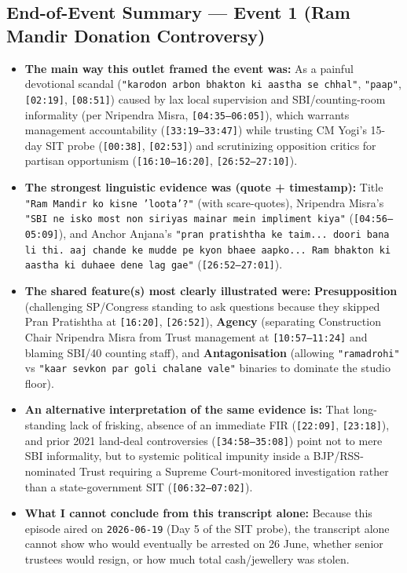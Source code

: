 \documentclass[10pt,a4paper]{article}
\begin{document}
\subsection*{End-of-Event Summary --- Event 1 (Ram Mandir Donation Controversy)}
\begin{itemize}[leftmargin=1.5em, itemsep=3pt, topsep=4pt]
  \item \textbf{The main way this outlet framed the event was:} As a painful devotional scandal (\texttt{"karodon arbon bhakton ki aastha se chhal"}, \texttt{"paap"}, \texttt{[02:19]}, \texttt{[08:51]}) caused by lax local supervision and SBI/counting-room informality (per Nripendra Misra, \texttt{[04:35--06:05]}), which warrants management accountability (\texttt{[33:19--33:47]}) while trusting CM Yogi's 15-day SIT probe (\texttt{[00:38]}, \texttt{[02:53]}) and scrutinizing opposition critics for partisan opportunism (\texttt{[16:10--16:20]}, \texttt{[26:52--27:10]}).
  \item \textbf{The strongest linguistic evidence was (quote + timestamp):} Title \texttt{"Ram Mandir ko kisne 'loota'?"} (with scare-quotes), Nripendra Misra's \texttt{"SBI ne isko most non siriyas mainar mein impliment kiya"} (\texttt{[04:56--05:09]}), and Anchor Anjana's \texttt{"pran pratishtha ke taim... doori bana li thi. aaj chande ke mudde pe kyon bhaee aapko... Ram bhakton ki aastha ki duhaee dene lag gae"} (\texttt{[26:52--27:01]}).
  \item \textbf{The shared feature(s) most clearly illustrated were:} \textbf{Presupposition} (challenging SP/Congress standing to ask questions because they skipped Pran Pratishtha at \texttt{[16:20]}, \texttt{[26:52]}), \textbf{Agency} (separating Construction Chair Nripendra Misra from Trust management at \texttt{[10:57--11:24]} and blaming SBI/40 counting staff), and \textbf{Antagonisation} (allowing \texttt{"ramadrohi"} vs \texttt{"kaar sevkon par goli chalane vale"} binaries to dominate the studio floor).
  \item \textbf{An alternative interpretation of the same evidence is:} That long-standing lack of frisking, absence of an immediate FIR (\texttt{[22:09]}, \texttt{[23:18]}), and prior 2021 land-deal controversies (\texttt{[34:58--35:08]}) point not to mere SBI informality, but to systemic political impunity inside a BJP/RSS-nominated Trust requiring a Supreme Court-monitored investigation rather than a state-government SIT (\texttt{[06:32--07:02]}).
  \item \textbf{What I cannot conclude from this transcript alone:} Because this episode aired on \texttt{2026-06-19} (Day 5 of the SIT probe), the transcript alone cannot show who would eventually be arrested on 26 June, whether senior trustees would resign, or how much total cash/jewellery was stolen.
\end{itemize}
\end{document}
